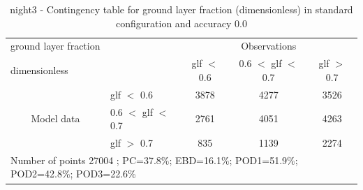\begin{table}[p!]
\begin{center}
\begin{tabular}{llccc}
\hline
{ground layer fraction}                                       &                                                    & \multicolumn{3}{c}{Observations}                 \\
{dimensionless}                                       &                             & glf $<$ 0.6   & 0.6 $<$ glf $<$ 0.7 & glf $>$ 0.7 \\
\hline
\multicolumn{1}{c}{\multirow{3}{*}{Model data}}  & glf $<$ 0.6             & 3878                & 4277                       & 3526              \\
                                                 & 0.6  $<$ glf $<$ 0.7 & 2761                & 4051                       & 4263              \\
                                                 & glf $>$ 0.7             & 835                & 1139                       & 2274              \\
\hline
\multicolumn{5}{l}{ Number of points        27004 ; PC=37.8\%; EBD=16.1\%; POD1=51.9\%; POD2=42.8\%; POD3=22.6\%}
\end{tabular}
\end{center}
\caption{night3 - Contingency table for  ground layer fraction (dimensionless) in standard configuration and accuracy 0.0}
\label{tab:contingencyglfBEF:night3}
\end{table}
